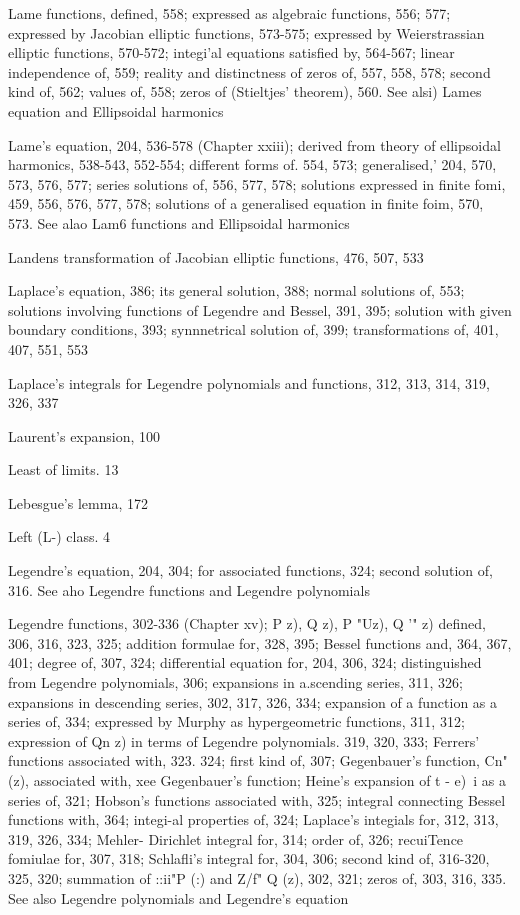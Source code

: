 Lame functions, defined, 558; expressed as algebraic functions, 556; 577; expressed by Jacobian
elliptic functions, 573-575; expressed by Weierstrassian elliptic functions, 570-572; integi'al
equations satisfied by, 564-567; linear independence of, 559; reality and distinctness of
zeros of, 557, 558, 578; second kind of, 562; values of, 558; zeros of (Stieltjes' theorem),
560. See alsi) Lames equation and Ellipsoidal harmonics

Lame's equation, 204, 536-578 (Chapter xxiii); derived from theory of ellipsoidal harmonics,
538-543, 552-554; different forms of. 554, 573; generalised,' 204, 570, 573, 576, 577;
series solutions of, 556, 577, 578; solutions expressed in finite fomi, 459, 556, 576, 577, 578;
solutions of a generalised equation in finite foim, 570, 573. See alao Lam6 functions and
Ellipsoidal harmonics

Landens transformation of Jacobian elliptic functions, 476, 507, 533

Laplace's equation, 386; its general solution, 388; normal solutions of, 553; solutions involving
functions of Legendre and Bessel, 391, 395; solution with given boundary conditions, 393;
synnnetrical solution of, 399; transformations of, 401, 407, 551, 553

Laplace's integrals for Legendre polynomials and functions, 312, 313, 314, 319, 326, 337

Laurent's expansion, 100

Least of limits. 13

Lebesgue's lemma, 172

Left (L-) class. 4

Legendre's equation, 204, 304; for associated functions, 324; second solution of, 316. See aho
Legendre functions and Legendre polynomials

Legendre functions, 302-336 (Chapter xv); P  z), Q  z), P "Uz), Q '" z) defined, 306, 316, 323,
325; addition formulae for, 328, 395; Bessel functions and, 364, 367, 401; degree of, 307,
324; differential equation for, 204, 306, 324; distinguished from Legendre polynomials,
306; expansions in a.scending series, 311, 326; expansions in descending series, 302, 317,
326, 334; expansion of a function as a series of, 334; expressed by Murphy as hypergeometric
functions, 311, 312; expression of Qn z) in terms of Legendre polynomials. 319, 320, 333;
Ferrers' functions associated with, 323. 324; first kind of, 307; Gegenbauer's function,
Cn" (z), associated with, xee Gegenbauer's function; Heine's expansion of  t - e)~i as a series
of, 321; Hobson's functions associated with, 325; integral connecting Bessel functions with,
364; integi-al properties of, 324; Laplace's integials for, 312, 313, 319, 326, 334; Mehler-
Dirichlet integral for, 314; order of, 326; recuiTence fomiulae for, 307, 318; Schlafli's
integral for, 304, 306; second kind of, 316-320, 325, 320; summation of ::ii"P (:) and
Z/f" Q  (z), 302, 321; zeros of, 303, 316, 335. See also Legendre polynomials and Legendre's
equation


